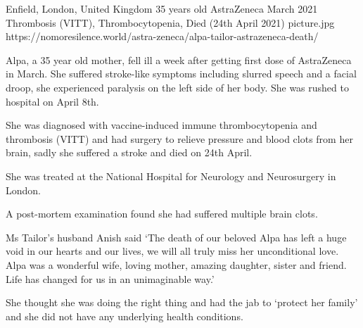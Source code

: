 {Enfield, London, United Kingdom}
{35 years old}
{AstraZeneca}
{March 2021}
{Thrombosis (VITT), Thrombocytopenia, Died (24th April 2021)}
{picture.jpg}
{https://nomoresilence.world/astra-zeneca/alpa-tailor-astrazeneca-death/}
{

Alpa, a 35 year old mother, fell ill a week after getting first dose of
AstraZeneca in March. She suffered stroke-like symptoms including slurred speech
and a facial droop, she experienced paralysis on the left side of her body. She
was rushed to hospital on April 8th.

She was diagnosed with vaccine-induced immune thrombocytopenia and thrombosis
(VITT) and had surgery to relieve pressure and blood clots from her brain, sadly
she suffered a stroke and died on 24th April.

She was treated at the National Hospital for Neurology and Neurosurgery in
London.

A post-mortem examination found she had suffered multiple brain clots.

Ms Tailor’s husband Anish said ‘The death of our beloved Alpa has left a huge
void in our hearts and our lives, we will all truly miss her unconditional
love. Alpa was a wonderful wife, loving mother, amazing daughter, sister and
friend. Life has changed for us in an unimaginable way.’

She thought she was doing the right thing and had the jab to ‘protect her
family’ and she did not have any underlying health conditions.

}
